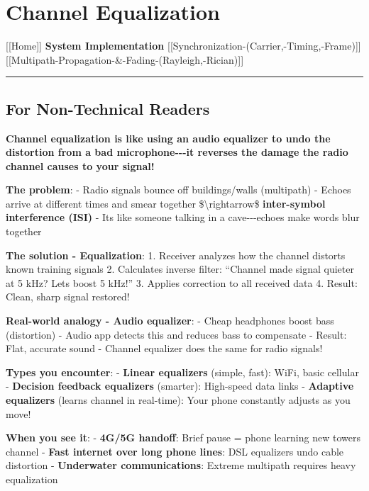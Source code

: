 \section{Channel Equalization}\label{channel-equalization}

{[}{[}Home{]}{]} \textbar{} \textbf{System Implementation} \textbar{}
{[}{[}Synchronization-(Carrier,-Timing,-Frame){]}{]} \textbar{}
{[}{[}Multipath-Propagation-\&-Fading-(Rayleigh,-Rician){]}{]}

\begin{center}\rule{0.5\linewidth}{0.5pt}\end{center}

\subsection{\texorpdfstring{ For Non-Technical
Readers}{ For Non-Technical Readers}}\label{for-non-technical-readers}

\textbf{Channel equalization is like using an audio equalizer to undo
the distortion from a bad microphone-\/-\/-it reverses the damage the
radio channel causes to your signal!}

\textbf{The problem}: - Radio signals bounce off buildings/walls
(multipath) - Echoes arrive at different times and smear together
\$\textbackslash rightarrow\$ \textbf{inter-symbol interference (ISI)} -
It\textquotesingle s like someone talking in a cave-\/-\/-echoes make
words blur together

\textbf{The solution - Equalization}: 1. Receiver analyzes how the
channel distorts known training signals 2. Calculates inverse filter:
``Channel made signal quieter at 5 kHz? Let\textquotesingle s boost 5
kHz!'' 3. Applies correction to all received data 4. Result: Clean,
sharp signal restored!

\textbf{Real-world analogy - Audio equalizer}: - Cheap headphones boost
bass (distortion) - Audio app detects this and reduces bass to
compensate - Result: Flat, accurate sound - Channel equalizer does the
same for radio signals!

\textbf{Types you encounter}: - \textbf{Linear equalizers} (simple,
fast): WiFi, basic cellular - \textbf{Decision feedback equalizers}
(smarter): High-speed data links - \textbf{Adaptive equalizers} (learns
channel in real-time): Your phone constantly adjusts as you move!

\textbf{When you see it}: - \textbf{4G/5G handoff}: Brief pause = phone
learning new tower\textquotesingle s channel - \textbf{Fast internet
over long phone lines}: DSL equalizers undo cable distortion -
\textbf{Underwater communications}: Extreme multipath requires heavy
equalization

